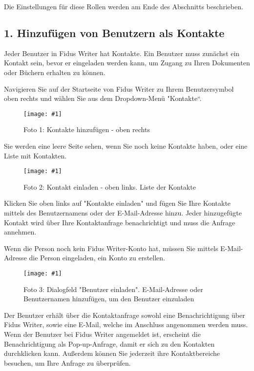 \documentclass{article}
\newlength{\imgwidth}
\newcommand\scaledgraphics[2]{%
                
\settowidth{\imgwidth}{\texttt{[image: \#1]}}%
                
\setlength{\imgwidth}{\minof{\imgwidth}{#2\textwidth}}%
                
\texttt{[image: \#1]}%
                
}
\begin{document}
Die Einstellungen für diese Rollen werden am Ende des Abschnitts beschrieben.


\subsection{1. Hinzufügen von Benutzern als Kontakte}\label{H5896646}



Jeder Benutzer in Fidus Writer hat Kontakte. Ein Benutzer muss zunächst ein Kontakt sein, bevor er eingeladen werden kann, um Zugang zu Ihren Dokumenten oder Büchern erhalten zu können.


Navigieren Sie auf der Startseite von Fidus Writer zu Ihrem Benutzersymbol oben rechts und wählen Sie aus dem Dropdown-Menü "Kontakte“.

\begin{figure}
\scaledgraphics{4d32eb57-f1d6-4bf1-8730-247ee912be96.png}{1}
\caption*{Foto 1: Kontakte hinzufügen - oben rechts}\label{F39011101}
\end{figure}


Sie werden eine leere Seite sehen, wenn Sie noch keine Kontakte haben, oder eine Liste mit Kontakten.

\begin{figure}
\scaledgraphics{8587b0fe-b0f6-4603-b19b-31eca1ab07da.png}{1}
\caption*{Foto 2: Kontakt einladen - oben links. Liste der Kontakte}\label{F79849051}
\end{figure}


 


Klicken Sie oben links auf "Kontakte einladen" und fügen Sie Ihre Kontakte mittels des Benutzernamens oder der E-Mail-Adresse hinzu. Jeder hinzugefügte Kontakt wird über Ihre Kontaktanfrage benachrichtigt und muss die Anfrage annehmen.


Wenn die Person noch kein Fidus Writer-Konto hat, müssen Sie mittels E-Mail-Adresse die Person eingeladen, ein Konto zu erstellen.

\begin{figure}
\scaledgraphics{3a1c9501-2029-440a-af1e-7e7a71d59ad0.png}{1}
\caption*{Foto 3: Dialogfeld "Benutzer einladen". E-Mail-Adresse oder Benutzernamen hinzufügen, um den Benutzer einzuladen}\label{F79384891}
\end{figure}


Der Benutzer erhält über die Kontaktanfrage sowohl eine Benachrichtigung über Fidus Writer, sowie eine E-Mail, welche im Anschluss angenommen werden muss. Wenn der Benutzer bei Fidus Writer angemeldet ist, erscheint die Benachrichtigung als Pop-up-Anfrage, damit er sich zu den Kontakten durchklicken kann. Außerdem können Sie jederzeit ihre Kontaktbereiche besuchen, um Ihre Anfrage zu überprüfen.
\end{document}
